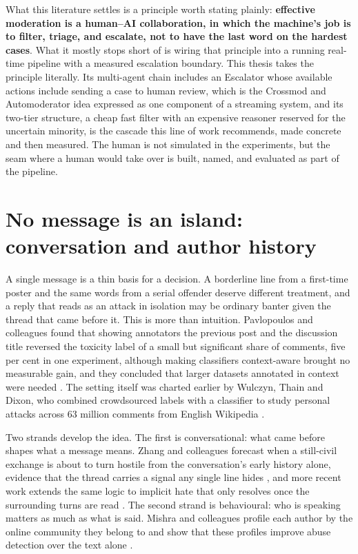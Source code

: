 What this literature settles is a principle worth stating plainly: \textbf{effective moderation is a human--AI collaboration, in which the machine's job is to filter, triage, and escalate, not to have the last word on the hardest cases}. What it mostly stops short of is wiring that principle into a running real-time pipeline with a measured escalation boundary. This thesis takes the principle literally. Its multi-agent chain includes an Escalator whose available actions include sending a case to human review, which is the Crossmod and Automoderator idea expressed as one component of a streaming system, and its two-tier structure, a cheap fast filter with an expensive reasoner reserved for the uncertain minority, is the cascade this line of work recommends, made concrete and then measured. The human is not simulated in the experiments, but the seam where a human would take over is built, named, and evaluated as part of the pipeline.

\section{No message is an island: conversation and author history}\label{contextual-behavioural}

A single message is a thin basis for a decision. A borderline line from a first-time poster and the same words from a serial offender deserve different treatment, and a reply that reads as an attack in isolation may be ordinary banter given the thread that came before it. This is more than intuition. Pavlopoulos and colleagues found that showing annotators the previous post and the discussion title reversed the toxicity label of a small but significant share of comments, five per cent in one experiment, although making classifiers context-aware brought no measurable gain, and they concluded that larger datasets annotated in context were needed \citep{pavlopoulos2020context}. The setting itself was charted earlier by Wulczyn, Thain and Dixon, who combined crowdsourced labels with a classifier to study personal attacks across 63 million comments from English Wikipedia \citep{wulczyn2017exmachina}.

Two strands develop the idea. The first is conversational: what came before shapes what a message means. Zhang and colleagues forecast when a still-civil exchange is about to turn hostile from the conversation's early history alone, evidence that the thread carries a signal any single line hides \citep{zhang2018awry}, and more recent work extends the same logic to implicit hate that only resolves once the surrounding turns are read \citep{ghosh2023cosyn}. The second strand is behavioural: who is speaking matters as much as what is said. Mishra and colleagues profile each author by the online community they belong to and show that these profiles improve abuse detection over the text alone \citep{mishra2018author}.

